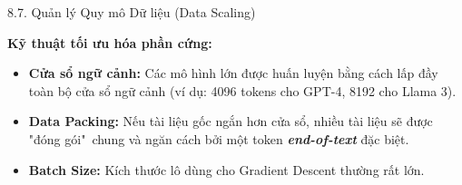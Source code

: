 \begin{frame}{8.7. Quản lý Quy mô Dữ liệu (Data Scaling)}
	
	\textbf{Kỹ thuật tối ưu hóa phần cứng:}
	
	\vspace{0.4cm}
	
	\begin{itemize}
		\setlength{\itemsep}{0.4cm} %
		\item \textbf{Cửa sổ ngữ cảnh:} Các mô hình lớn được huấn luyện bằng cách lấp đầy toàn bộ cửa sổ ngữ cảnh (ví dụ: 4096 tokens cho GPT-4, 8192 cho Llama 3).
		\item \textbf{Data Packing:} Nếu tài liệu gốc ngắn hơn cửa sổ, nhiều tài liệu sẽ được "đóng gói"\ chung và ngăn cách bởi một token \textit{\textbf{end-of-text}} đặc biệt.
		\item \textbf{Batch Size:} Kích thước lô dùng cho Gradient Descent thường rất lớn.
	\end{itemize}
	
\end{frame}
